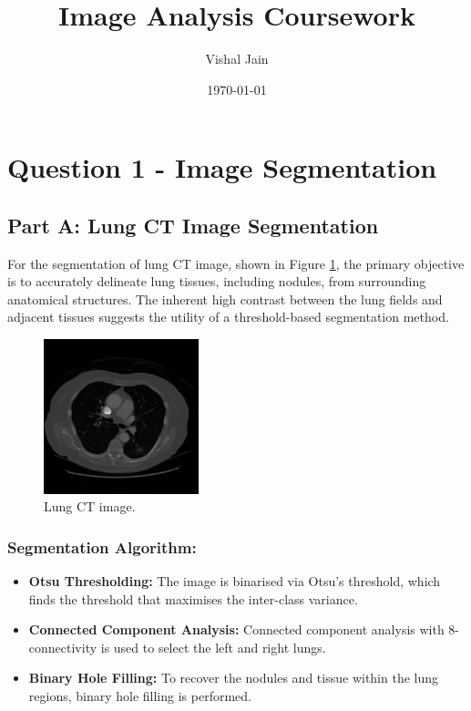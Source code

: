 \documentclass[11pt]{article}
\begin{document}
\title{Image Analysis Coursework}
\author{Vishal Jain}
\date{\today}
\newpage
\maketitle
\tableofcontents
\newpage
\section{Question 1 - Image Segmentation}

\subsection{Part A: Lung CT Image Segmentation}
For the segmentation of lung CT image, shown in Figure \ref{fig:lung_ct}, the primary objective is to accurately delineate lung tissues, including nodules, from surrounding anatomical structures. The inherent high contrast between the lung fields and adjacent tissues suggests the utility of a threshold-based segmentation method.

\begin{figure}[H]
    \centering
    \includegraphics[width=0.4\textwidth]{../data/CT.png}
    \caption{Lung CT image.}
    \label{fig:lung_ct}
\end{figure}

\subsubsection{Segmentation Algorithm:}

\begin{itemize}
    \item \textbf{Otsu Thresholding:} The image is binarised via Otsu's threshold, which finds the threshold that maximises the inter-class variance.
    \item \textbf{Connected Component Analysis:} Connected component analysis with 8-connectivity is used to select the left and right lungs.
    \item \textbf{Binary Hole Filling:} To recover the nodules and tissue within the lung regions, binary hole filling is performed.
\end{itemize}
\end{document}

